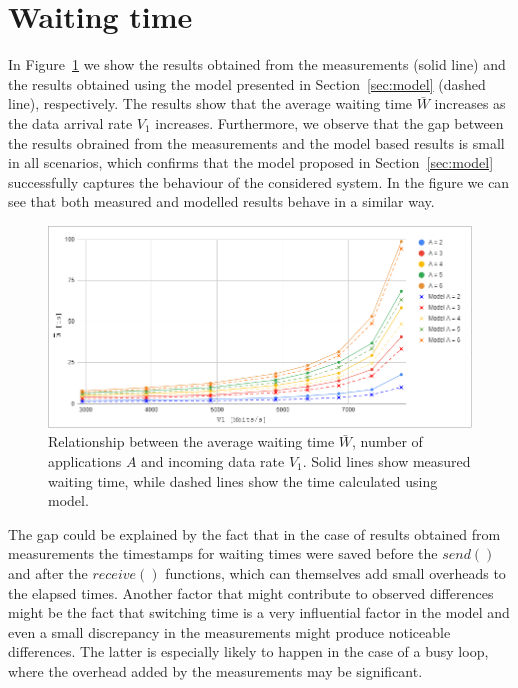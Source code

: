 \documentclass[english]{kththesis}
\begin{document}
\section{Waiting time}
In Figure~\ref{fig:Twresults} we show the results obtained from the measurements (solid line) and the results obtained using the model presented in Section~\ref{sec:model} (dashed line), respectively. The results show that the average waiting time \(\bar{W}\) increases as the data arrival rate \(V_1\) increases. Furthermore, we observe that the gap between the results obrained from the measurements and the model based results is small in all scenarios, which confirms that the model proposed in Section~\ref{sec:model} successfully captures the behaviour of the considered system. In the figure we can see that both measured and modelled results behave in a similar way.
\begin{figure}[!ht]
  \centering
    \includegraphics[width=1\textwidth]{Fig18.png}
  \caption{Relationship between the average waiting time \(\bar{W}\), number of applications \(A\) and incoming data rate \(V_1\). Solid lines show measured waiting time, while dashed lines show the time calculated using model.}
  \label{fig:Twresults}
\end{figure}
The gap could be explained by the fact that in the case of results obtained from measurements the timestamps for waiting times were saved before the \(send()\) and after the \(receive()\) functions, which can themselves add small overheads to the elapsed times. Another factor that might contribute to observed differences might be the fact that switching time is a very influential factor in the model and even a small discrepancy in the measurements might produce noticeable differences. The latter is especially likely to happen in the case of a busy loop, where the overhead added by the measurements may be significant.
\end{document}
